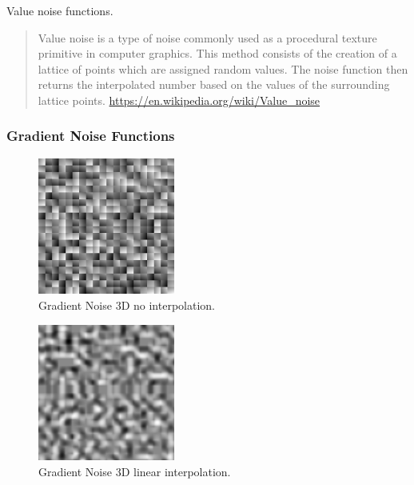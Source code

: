 Value noise functions.

\begin{quote}
Value noise is a type of noise commonly used as a procedural texture primitive in computer graphics.
This method consists of the creation of a lattice of points which are assigned random values.
The noise function then returns the interpolated number based on the values of the surrounding lattice points.
\url{https://en.wikipedia.org/wiki/Value_noise}
\end{quote}

\subsubsection{Gradient Noise Functions}

\begin{figure}[h]
\centering
\includegraphics[width=0.4\textwidth]{out/noise_functions/gradient_noise3D_noInterp.png}
\caption{Gradient Noise 3D no interpolation.}
\label{fig:gradient_noise3D_noInterp}
\end{figure}

\begin{figure}[h]
\centering
\includegraphics[width=0.4\textwidth]{out/noise_functions/gradient_noise3D_linearInterp.png}
\caption{Gradient Noise 3D linear interpolation.}
\label{fig:gradient_noise3D_linearInterp}
\end{figure}

